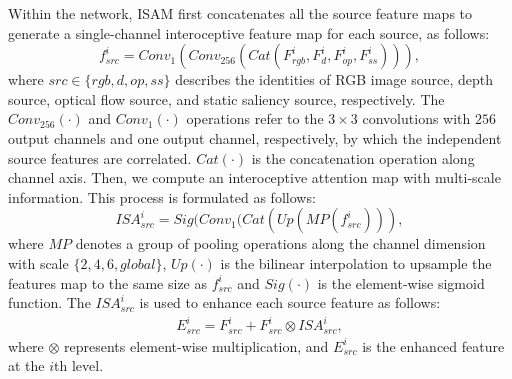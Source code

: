\documentclass[sigconf]{acmart}
\begin{document}
Within the network, ISAM first concatenates all the source feature maps to generate a single-channel interoceptive feature map for each source, as follows:
\begin{equation}\label{equ:1}
    {f}_{src}^i = Conv_{1}(Conv_{256}(Cat(F_{rgb}^i, F_{d}^i, F_{op}^i, F_{ss}^i))),
\end{equation}
where $src\in\{rgb, d, op, ss\}$ describes the identities of RGB image source, depth source, optical flow source, and static saliency source, respectively. The $Conv_{256}(\cdot)$ and $Conv_{1}(\cdot)$ operations refer to the $3\times 3$ convolutions with $256$ output channels and one output channel, respectively, by which the independent source features are correlated.
$Cat(\cdot)$ is the concatenation operation along channel axis. 
Then, we compute an interoceptive attention map
with multi-scale information. This process is formulated as follows:
\begin{equation}\label{equ:2}
    {ISA}_{src}^i = Sig(Conv_{1}(Cat(Up(MP({f}_{src}^i))), 
\end{equation}
where $MP$ denotes a group of pooling operations along the channel dimension with scale $\{2, 4, 6, global\}$, $Up(\cdot)$ is the bilinear interpolation to upsample the features map to the same size as ${f}_{src}^{i}$ and $Sig(\cdot)$ is the element-wise sigmoid function.  The ${ISA}_{src}^i$ is used to enhance each source feature as follows: 
\begin{equation}\label{equ:3}
    \begin{split}
        {E}_{src}^i = {F}_{src}^i + {F}_{src}^i \otimes {ISA}_{src}^i, 
    \end{split}
\end{equation}
where $\otimes$ represents element-wise multiplication, and ${E}_{src}^i$ is the enhanced feature at the $i$th level.
\end{document}
